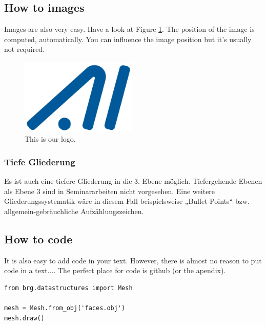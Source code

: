 \subsection{How to images}
Images are also very easy. Have a look at Figure \ref{aimotionlogo}.
The position of the image is computed, automatically.
You can influence the image position but it's usually not required. 
\begin{figure}[t]
\centering
	\includegraphics[width=15em]{thi_AImotion_logo.jpg}
	\caption{This is our logo.}
	\label{aimotionlogo}
\end{figure}

\subsubsection{Tiefe Gliederung}

Es ist auch eine tiefere Gliederung in die 3. Ebene möglich. Tiefergehende Ebenen als Ebene 3 sind in Seminararbeiten nicht vorgesehen. Eine weitere Gliederungssystematik wäre in diesem Fall beispielsweise „Bullet-Points“ bzw. allgemein-gebräuchliche Aufzählungszeichen.

\subsection{How to code}
It is also easy to add code in your text.
However, there is almost no reason to put code in a text....
The perfect place for code is github (or the apendix).
\lstset{language=Python}
\lstset{frame=lines}
\lstset{basicstyle=\footnotesize}
\begin{lstlisting}
from brg.datastructures import Mesh
     
mesh = Mesh.from_obj('faces.obj')
mesh.draw()
\end{lstlisting}

